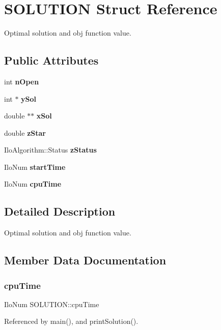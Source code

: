\section{S\+O\+L\+U\+T\+I\+ON Struct Reference}
\label{structSOLUTION}


Optimal solution and obj function value.  


\subsection*{Public Attributes}
\begin{DoxyCompactItemize}
\item 
int \textbf{ n\+Open}
\item 
int $\ast$ \textbf{ y\+Sol}
\item 
double $\ast$$\ast$ \textbf{ x\+Sol}
\item 
double \textbf{ z\+Star}
\item 
Ilo\+Algorithm\+::\+Status \textbf{ z\+Status}
\item 
Ilo\+Num \textbf{ start\+Time}
\item 
Ilo\+Num \textbf{ cpu\+Time}
\end{DoxyCompactItemize}


\subsection{Detailed Description}
Optimal solution and obj function value. 

\subsection{Member Data Documentation}
\mbox{\label{structSOLUTION_adfe9fcb60f1b7f7e5cf40c2e67a358ac}} 
\subsubsection{cpu\+Time}
{\footnotesize\ttfamily Ilo\+Num S\+O\+L\+U\+T\+I\+O\+N\+::cpu\+Time}



Referenced by main(), and print\+Solution().

\mbox{\label{structSOLUTION_a4b5c0faad21a36fb0016891dc5d62c2f}} 
